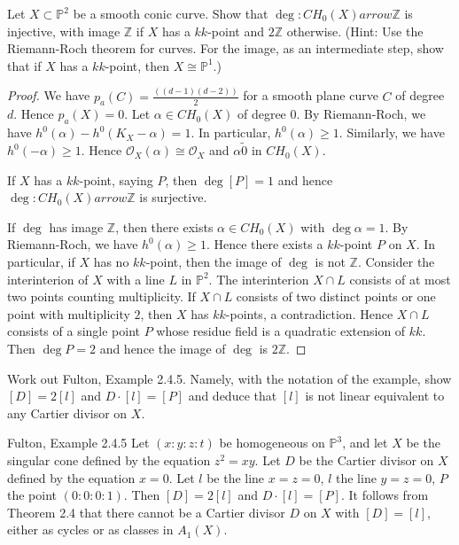 Let $X \subset \mathbb{P}^2$ be a smooth conic curve. Show that $\deg : CH_0\left(X\right) arrow \mathbb{Z}$ is injective, with image $\mathbb{Z}$ if $X$ has a $kk$-point and $2\mathbb{Z}$ otherwise. (Hint: Use the Riemann-Roch theorem for curves. For the image, as an intermediate step, show that if $X$ has a $kk$-point, then $X \cong \mathbb{P}^1$.) 

\begin{proof}
We have $p_a \left(C\right) = \frac{(\left(d - 1\right)\left(d - 2\right))}{2}$ for a smooth plane curve $C$ of degree $d$. Hence $p_a \left(X\right) = 0$. Let $\alpha \in CH_0\left(X\right)$ of degree $0$. By Riemann-Roch, we have $h^0\left(\alpha\right) - h^0\left(K_X - \alpha\right) = 1$. In particular, $h^0 \left(\alpha\right) \geqslant 1$. Similarly, we have $h^0 \left(-\alpha\right) \geqslant 1$. Hence $\mathcal{O}_X \left(\alpha\right) \cong \mathcal{O}_X$ and $\alpha \tilde 0$ in $CH_0\left(X\right)$.

If $X$ has a $kk$-point, saying $P$, then $\deg \left[P\right] = 1$ and hence $\deg : CH_0\left(X\right) arrow \mathbb{Z}$ is surjective.

If $\deg$ has image $\mathbb{Z}$, then there exists $\alpha \in CH_0\left(X\right)$ with $\deg \alpha = 1$. By Riemann-Roch, we have $h^0 \left(\alpha\right) \geqslant 1$. Hence there exists a $kk$-point $P$ on $X$. In particular, if $X$ has no $kk$-point, then the image of $\deg$ is not $\mathbb{Z}$. Consider the interinterion of $X$ with a line $L$ in $\mathbb{P}^2$. The interinterion $X \cap L$ consists of at most two points counting multiplicity. If $X \cap L$ consists of two distinct points or one point with multiplicity $2$, then $X$ has $kk$-points, a contradiction. Hence $X \cap L$ consists of a single point $P$ whose residue field is a quadratic extension of $kk$. Then $\deg P = 2$ and hence the image of $\deg$ is $2\mathbb{Z}$. \end{proof}

Work out Fulton, Example 2.4.5. Namely, with the notation of the example, show $\left[D\right] = 2\left[l\right]$ and $D \cdot \left[l\right] = \left[P\right]$ and deduce that $\left[l\right]$ is not linear equivalent to any Cartier divisor on $X$. 

\begin{example}
Fulton, Example 2.4.5 Let $\left(x : y : z : t\right)$ be homogeneous on $\mathbb{P}^3$, and let $X$ be the singular cone defined by the equation $z^2 = x y$. Let $D$ be the Cartier divisor on $X$ defined by the equation $x = 0$. Let $l$ be the line $x = z = 0$, $l$ the line $y = z = 0$, $P$ the point $\left(0 : 0 : 0 : 1\right)$. Then $\left[D\right] = 2\left[l\right]$ and $D \cdot \left[l\right] = \left[P\right]$. It follows from Theorem 2.4 that there cannot be a Cartier divisor $D$ on $X$ with $\left[D\right] = \left[l\right]$, either as cycles or as classes in $A_1\left(X\right)$. \end{example}

